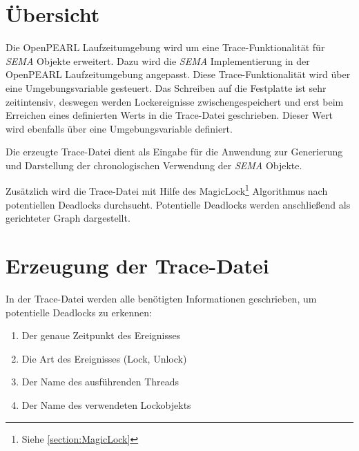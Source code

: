 \section{Übersicht}
\label{section:Übersicht}
Die OpenPEARL Laufzeitumgebung wird um eine Trace-Funktionalität für \emph{SEMA}
Objekte erweitert. Dazu wird die \emph{SEMA} Implementierung in der OpenPEARL
Laufzeitumgebung angepasst. Diese Trace-Funktionalität wird über eine
Umgebungsvariable gesteuert. Das Schreiben auf die Festplatte ist sehr
zeitintensiv, deswegen werden Lockereignisse zwischengespeichert und erst beim
Erreichen eines definierten Werts in die Trace-Datei geschrieben. Dieser Wert
wird ebenfalls über eine Umgebungsvariable definiert.

Die erzeugte Trace-Datei dient als Eingabe für die Anwendung zur Generierung und
Darstellung der chronologischen Verwendung der \emph{SEMA} Objekte.

Zusätzlich wird die Trace-Datei mit Hilfe des MagicLock\footnote{Siehe
\cref{section:MagicLock}} Algorithmus nach potentiellen Deadlocks durchsucht.
Potentielle Deadlocks werden anschließend als gerichteter Graph dargestellt.

\section{Erzeugung der Trace-Datei}
\label{section:Erzeugung der Trace-Datei}
In der Trace-Datei werden alle benötigten Informationen geschrieben, um
potentielle Deadlocks zu erkennen:
\begin{enumerate}
  \item Der genaue Zeitpunkt des Ereignisses 
  \item Die Art des Ereignisses (Lock, Unlock)
  \item Der Name des ausführenden Threads
  \item Der Name des verwendeten Lockobjekts
\end{enumerate}

